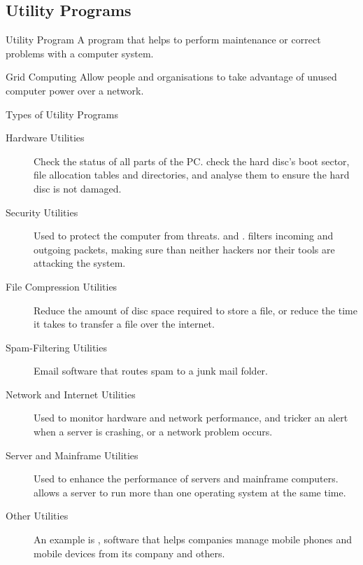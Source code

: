 \documentclass[\main/notes.tex]{subfiles}
\begin{document}
			\subsection{Utility Programs}
				\begin{definition}{Utility Program}
					A program that helps to perform maintenance or correct problems with a computer system.
				\end{definition}
				\begin{definition}{Grid Computing}
					Allow people and organisations to take advantage of unused computer power over a network.
				\end{definition}
				\begin{sidenote}{Types of Utility Programs}
					\begin{description}
						\item[Hardware Utilities] Check the status of all parts of the PC.  check the hard disc's boot sector, file allocation tables and directories, and analyse them to ensure the hard disc is not damaged.
						\item[Security Utilities] Used to protect the computer from threats.  and .  filters incoming and outgoing packets, making sure than neither hackers nor their tools are attacking the system.
						\item[File Compression Utilities] Reduce the amount of disc space required to store a file, or reduce the time it takes to transfer a file over the internet.
						\item[Spam-Filtering Utilities] Email software that routes spam to a junk mail folder.
						\item[Network and Internet Utilities] Used to monitor hardware and network performance, and tricker an alert when a server is crashing, or a network problem occurs.
						\item[Server and Mainframe Utilities] Used to enhance the performance of servers and mainframe computers.  allows a server to run more than one operating system at the same time.
						\item[Other Utilities] An example is , software that helps companies manage mobile phones and mobile devices from its company and others.
					\end{description}
				\end{sidenote}
\end{document}
